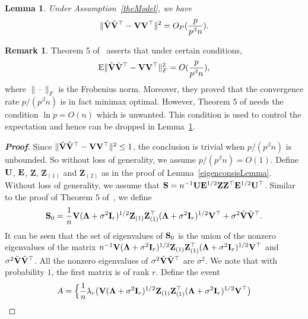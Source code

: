 \documentclass[times,sort&compress,3p]{elsarticle}
\newcommand{\myE}{ {\rm E} }
\newcommand{\bZ}{\mathbf{Z}}
\theoremstyle{plain}
\newtheorem{lemma}{\quad\quad Lemma}
\theoremstyle{definition}
\newtheorem{remark}{\quad\quad Remark}
\theoremstyle{remark}
\begin{document}
\begin{appendices}
\begin{lemma}\label{conRateLemma}
    Under Assumption~\ref{theModel}, we have
\begin{equation*}
\|\hat{\mathbf{V}}\hat{\mathbf{V}}^\top -\mathbf{V}\mathbf{V}^\top \|^2 =O_P(\frac{p}{p^{\beta}n}).
\end{equation*}
\end{lemma}
\begin{remark}
    Theorem 5 of~\cite{Cai2012Sparse} asserts that under certain conditions,
$$
\myE \|\hat{\BV}\hat{\BV}^\top -\BV\BV^\top \|_F^2 =O(\frac{p}{p^{\beta}n}),
    $$
    where $\|\cdot\|_F$ is the Frobenius norm.
    Moreover, they proved that the convergence rate $p/(p^{\beta}n)$ is in fact minimax optimal.
    However,  Theorem 5 of \cite{Cai2012Sparse} needs the condition $\ln p=O(n)$ which is unwanted.
    This condition is used to control the expectation and hence can be dropped in Lemma~\ref{conRateLemma}.
\end{remark}
\begin{proof}[\textbf{Proof}]
    Since $\|\hat{\mathbf{V}}\hat{\mathbf{V}}^\top-\mathbf{V}\mathbf{V}^\top\|^2\leq 1$, the conclusion is trivial when $p/(p^{\beta} n)$ is unbounded.
    So without loss of generality, we assume $p/(p^{\beta} n)=O(1)$.
    Define $\mathbf{U}$, $\mathbf{E}$, $\bZ$, $\bZ_{(1)}$ and $\bZ_{(2)}$ as in the proof of Lemma~\ref{eigenconsisLemma}.
Without loss of generality, we assume that $\BS= n^{-1}\BU\BE^{1/2}\bZ \bZ^\top \BE^{1/2} \BU^\top$. 
    Similar to the proof of Theorem 5 of~\cite{Cai2012Sparse},
we define 
    $$
    \BS_0=
        \frac{1}{n}\BV(\bLambda+\sigma^2\BI_r)^{1/2}\bZ_{(1)} \bZ_{(1)}^\top(\bLambda+\sigma^2\BI_r)^{1/2}\BV^\top
        +\sigma^2\tilde{\BV}\tilde{\BV}^\top.
    $$
    It can be seen that the set of eigenvalues of $\mathbf{S}_0$ is the union of the nonzero eigenvalues of the matrix $n^{-1}\BV(\bLambda+\sigma^2\BI_r)^{1/2}\bZ_{(1)} \bZ_{(1)}^\top(\bLambda+\sigma^2\BI_r)^{1/2}\BV^\top$ and $\sigma^2\tilde{\mathbf{V}}\tilde{\mathbf{V}}^\top$.
All the nonzero eigenvalues of $\sigma^2\tilde{\mathbf{V}}\tilde{\mathbf{V}}^\top$ are $\sigma^2$.
We note that with probability $1$, the first matrix is of rank $r$.
        Define the event
        $$
        A=
        \Big\{
        \frac{1}{n}\lambda_r\big(\BV(\bLambda+\sigma^2 \BI_r)^{1/2}\bZ_{(1)} \bZ_{(1)}^\top(\bLambda+\sigma^2 \BI_r)^{1/2}\BV^\top\big)
$$
\end{proof}
\end{appendices}
\end{document}
